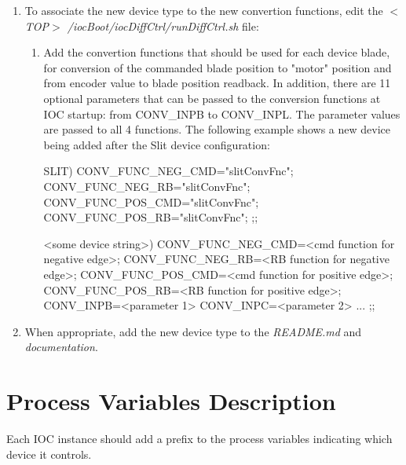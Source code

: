 \documentclass[openany]{article}
\begin{document}
        \begin{enumerate}
            \item To associate the new device type to the new convertion functions, edit the \emph{$<$TOP$>$ /iocBoot/iocDiffCtrl/runDiffCtrl.sh} file:
            \begin{enumerate}
                \item Add the convertion functions that should be used for each device blade, for conversion of the commanded blade position to "motor" position and from encoder value to blade position readback. In addition, there are 11 optional parameters that can be passed to the conversion functions at IOC startup: from CONV\_INPB to CONV\_INPL. The parameter values are passed to all 4 functions. The following example shows a new device being added after the Slit device configuration:
                \vspace{1mm}
                \begin{code}
    SLIT)
        CONV_FUNC_NEG_CMD="slitConvFnc";
        CONV_FUNC_NEG_RB="slitConvFnc";
        CONV_FUNC_POS_CMD="slitConvFnc";
        CONV_FUNC_POS_RB="slitConvFnc";
        ;;

    <some device string>)
        CONV_FUNC_NEG_CMD=<cmd function for negative edge>;
        CONV_FUNC_NEG_RB=<RB function for negative edge>;
        CONV_FUNC_POS_CMD=<cmd function for positive edge>;
        CONV_FUNC_POS_RB=<RB function for positive edge>;
        CONV_INPB=<parameter 1>
        CONV_INPC=<parameter 2>
        ...
        ;;
                \end{code}
                \vspace{1mm}
            \end{enumerate}
            \item When appropriate, add the new device type to the \emph{README.md} and \emph{documentation}.
        \end{enumerate}

\newpage
\section{Process Variables Description}\label{sec:process-variables}

    Each IOC instance should add a prefix to the process variables indicating which device it controls.
\end{document}
